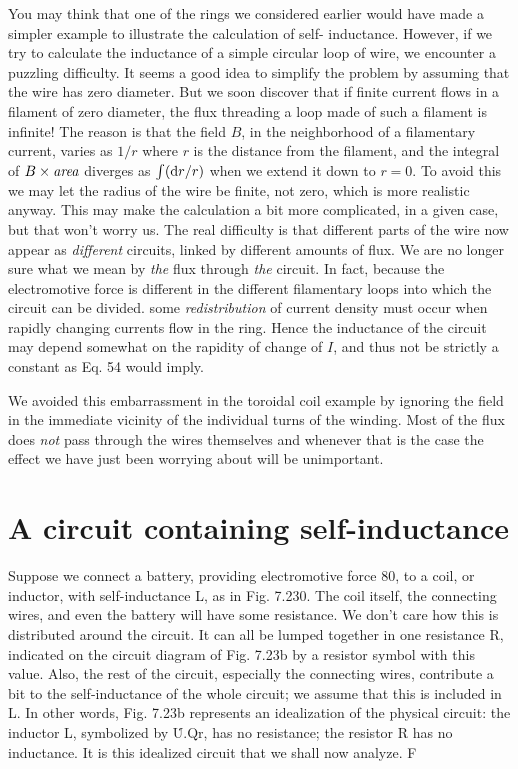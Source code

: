 You may think that one of the rings we considered earlier would
have made a simpler example to illustrate the calculation of self-
inductance. However, if we try to calculate the inductance of a
simple circular loop of wire, we encounter a puzzling difficulty. It
seems a good idea to simplify the problem by assuming that the wire
has zero diameter. But we soon discover that if finite current flows
in a filament of zero diameter, the flux threading a loop made of such
a filament is infinite! The reason is that the field $B$, in the neighborhood
of a filamentary current, varies as $1/r$ where $r$ is the distance
from the filament, and the integral of $B\times\text{\emph{area}}$ diverges as $\int(\textup{d} r/r)$
when we extend it down to $r = 0$. To avoid this we may let the radius
of the wire be finite, not zero, which is more realistic anyway. This
may make the calculation a bit more complicated, in a given case,
but that won't worry us. The real difficulty is that different parts of
the wire now appear as \emph{different} circuits, linked by different amounts
of flux. We are no longer sure what we mean by \emph{the} flux through \emph{the}
circuit. In fact, because the electromotive force is different in the
different filamentary loops into which the circuit can be divided. some
\emph{redistribution} of current density must occur when rapidly changing
currents flow in the ring. Hence the inductance of the circuit may
depend somewhat on the rapidity of change of $I$, and thus not be
strictly a constant as Eq. 54 would imply.

We avoided this embarrassment in the toroidal coil example by
ignoring the field in the immediate vicinity of the individual turns of
the winding. Most of the flux does \emph{not} pass through the wires themselves
and whenever that is the case the effect we have just been
worrying about will be unimportant.

\iffalse

\section{A circuit containing self-inductance}

Suppose we connect a battery, providing electromotive force 80,
to a coil, or inductor, with self-inductance L, as in Fig. 7.230. The
coil itself, the connecting wires, and even the battery will have some
resistance. We don't care how this is distributed around the circuit.
It can all be lumped together in one resistance R, indicated on the
circuit diagram of Fig. 7.23b by a resistor symbol with this value.
Also, the rest of the circuit, especially the connecting wires, contribute
a bit to the self-inductance of the whole circuit; we assume that
this is included in L. In other words, Fig. 7.23b represents an
idealization of the physical circuit: the inductor L, symbolized by
\.U.Qr, has no resistance; the resistor R has no inductance. It is
this idealized circuit that we shall now analyze. F

